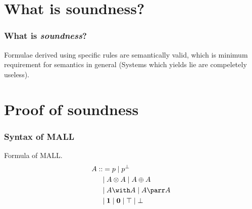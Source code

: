 \documentclass[dvipdfmx,cjk]{beamer}
\theoremstyle{example}
\begin{document}
\section{What is soundness?}
                          
\begin{frame}
  \frametitle{What is \textit{soundness}?} 

  Formulae derived using specific rules are semantically valid, which is minimum requirement for semantics in general (Systems which yields lie are compeletely useless).
  
\end{frame}

\section{Proof of soundness}

\begin{frame}
  \frametitle{Syntax of MALL}
  \begin{definition}{Formula of MALL.}
    \begin{align*}
      A ::&= p              \; | \;
             p^{\bot}        \\
      &| \;
             A \otimes A    \; | \;
             A \oplus  A    \\
      &| \;
             A \with A      \; | \;
             A \parr A      \\
      &| \;
             \textbf{1}     \; | \;
             \textbf{0}     \; | \;
             \top           \; | \;
             \bot
    \end{align*}
  \end{definition}
\end{frame}
\end{document}

